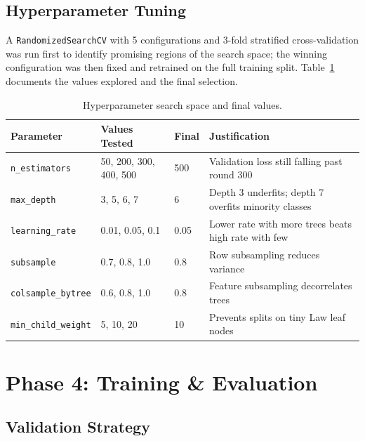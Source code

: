 \subsection{Hyperparameter Tuning}

A \texttt{RandomizedSearchCV} with 5 configurations and 3-fold
stratified cross-validation was run first to identify promising regions
of the search space; the winning configuration was then fixed and
retrained on the full training split. Table~\ref{tab:hparams} documents
the values explored and the final selection.

\begin{table}[h]
\centering
\small
\caption{Hyperparameter search space and final values.}
\label{tab:hparams}
\begin{tabular}{llll}
\toprule
\textbf{Parameter} & \textbf{Values Tested} & \textbf{Final}
  & \textbf{Justification} \\
\midrule
\texttt{n\_estimators}      & 50, 200, 300, 400, 500 & 500
  & Validation loss still falling past round 300 \\
\texttt{max\_depth}         & 3, 5, 6, 7             & 6
  & Depth 3 underfits; depth 7 overfits minority classes \\
\texttt{learning\_rate}     & 0.01, 0.05, 0.1        & 0.05
  & Lower rate with more trees beats high rate with few \\
\texttt{subsample}          & 0.7, 0.8, 1.0          & 0.8
  & Row subsampling reduces variance \\
\texttt{colsample\_bytree}  & 0.6, 0.8, 1.0          & 0.8
  & Feature subsampling decorrelates trees \\
\texttt{min\_child\_weight} & 5, 10, 20              & 10
  & Prevents splits on tiny Law leaf nodes \\
\bottomrule
\end{tabular}
\end{table}


\section{Phase 4: Training \& Evaluation}

\subsection{Validation Strategy}

